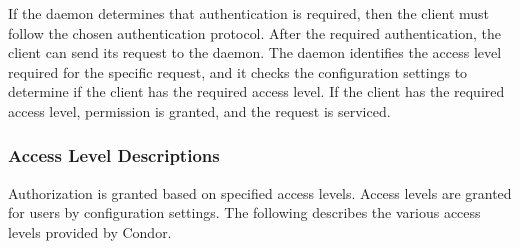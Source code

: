If the daemon determines that authentication is required,
then the client must follow the chosen authentication protocol.
After the required authentication,
the client can send its request to the daemon.
The daemon identifies the access level required for the specific request,
and it checks the configuration settings to
determine if the client has the required access level.
If the client has the required access level,
permission is granted, and the request is serviced.


\subsubsection{\label{sec:Security-access-levels}Access Level Descriptions}
Authorization is granted based on specified access levels.
Access levels are granted for users by configuration settings.
The following describes the various access levels provided
by Condor.

